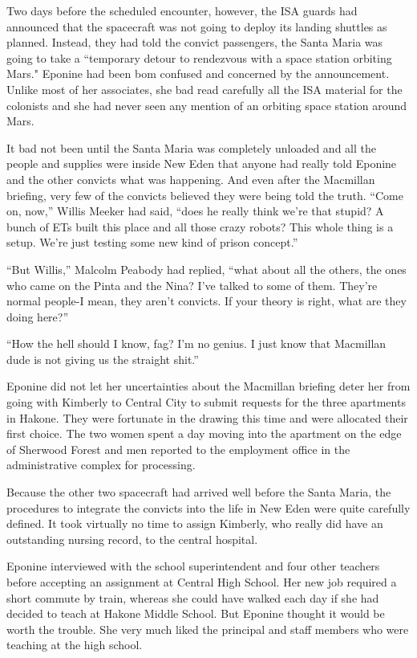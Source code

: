 \documentclass[]{article}
\begin{document}
{Two days before the scheduled encounter, however, the ISA guards had announced that the spacecraft was not going to deploy its landing shuttles as planned.  Instead, they had told the convict passengers, the Santa Maria was going to take a “temporary detour to rendezvous with a space station orbiting Mars."  Eponine had been bom confused and concerned by the announcement.  Unlike most of her associates, she bad read carefully all the ISA material for the colonists and she had never seen any mention of an orbiting space station around Mars.

It bad not been until the Santa Maria was completely unloaded and all the people and supplies were inside New Eden that anyone had really told Eponine and the other convicts what was happening.  And even after the Macmillan briefing, very few of the convicts believed they were being told the truth.  “Come on, now,” Willis Meeker had said, “does he really think we’re that stupid? A bunch of ETs built this place and all those crazy robots? This whole thing is a setup.  We’re just testing some new kind of prison concept.”

“But Willis,” Malcolm Peabody had replied, “what about all the others, the ones who came on the Pinta and the Nina? I’ve talked to some of them.  They’re normal people-I mean, they aren’t convicts.  If your theory is right, what are they doing here?”

“How the hell should I know, fag? I’m no genius.  I just know that Macmillan dude is not giving us the straight shit.”

Eponine did not let her uncertainties about the Macmillan briefing deter her from going with Kimberly to Central City to submit requests for the three apartments in Hakone.  They were fortunate in the drawing this time and were allocated their first choice.  The two women spent a day moving into the apartment on the edge of Sherwood Forest and men reported to the employment office in the administrative complex for processing.

Because the other two spacecraft had arrived well before the Santa Maria, the procedures to integrate the convicts into the life in New Eden were quite carefully defined.  It took virtually no time to assign Kimberly, who really did have an outstanding nursing record, to the central hospital.

Eponine interviewed with the school superintendent and four other teachers before accepting an assignment at Central High School.  Her new job required a short commute by train, whereas she could have walked each day if she had decided to teach at Hakone Middle School.  But Eponine thought it would be worth the trouble.  She very much liked the principal and staff members who were teaching at the high school.

}
\end{document}
